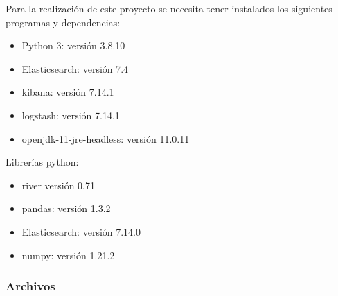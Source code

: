 Para la realización de este proyecto se necesita tener instalados los siguientes programas y dependencias:

\begin{itemize}
    \item Python 3: versión 3.8.10 
    \item Elasticsearch: versión 7.4
    \item kibana: versión 7.14.1
    \item logstash: versión 7.14.1
    \item openjdk-11-jre-headless: versión 11.0.11
\end{itemize}
Librerías python:
\begin{itemize}
    \item river versión 0.71
    \item pandas: versión 1.3.2
    \item Elasticsearch: versión 7.14.0
    \item numpy: versión 1.21.2
\end{itemize}

\subsubsection{Archivos}

